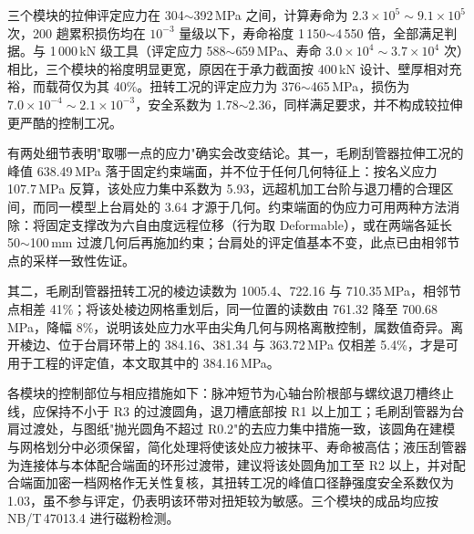 三个模块的拉伸评定应力在 304$\sim$392\,MPa 之间，计算寿命为 $2.3\times10^{5}\sim9.1\times10^{5}$ 次，200 趟累积损伤均在 $10^{-3}$ 量级以下，寿命裕度 1\,150$\sim$4\,550 倍，全部满足判据。与 1\,000\,kN 级工具（评定应力 588$\sim$659\,MPa、寿命 $3.0\times10^{4}\sim3.7\times10^{4}$ 次）相比，三个模块的裕度明显更宽，原因在于承力截面按 400\,kN 设计、壁厚相对充裕，而载荷仅为其 40\%。扭转工况的评定应力为 376$\sim$465\,MPa，损伤为 $7.0\times10^{-4}\sim2.1\times10^{-3}$，安全系数为 1.78$\sim$2.36，同样满足要求，并不构成较拉伸更严酷的控制工况。

有两处细节表明"取哪一点的应力"确实会改变结论。其一，毛刷刮管器拉伸工况的峰值 638.49\,MPa 落于固定约束端面，并不位于任何几何特征上：按名义应力 107.7\,MPa 反算，该处应力集中系数为 5.93，远超机加工台阶与退刀槽的合理区间，而同一模型上台肩处的 3.64 才源于几何。约束端面的伪应力可用两种方法消除：将固定支撑改为六自由度远程位移（行为取 Deformable），或在两端各延长 50$\sim$100\,mm 过渡几何后再施加约束；台肩处的评定值基本不变，此点已由相邻节点的采样一致性佐证。

其二，毛刷刮管器扭转工况的棱边读数为 1005.4、722.16 与 710.35\,MPa，相邻节点相差 41\%；将该处棱边网格重划后，同一位置的读数由 761.32 降至 700.68\,MPa，降幅 8\%，说明该处应力水平由尖角几何与网格离散控制，属数值奇异。离开棱边、位于台肩环带上的 384.16、381.34 与 363.72\,MPa 仅相差 5.4\%，才是可用于工程的评定值，本文取其中的 384.16\,MPa。

各模块的控制部位与相应措施如下：脉冲短节为心轴台阶根部与螺纹退刀槽终止线，应保持不小于 R3 的过渡圆角，退刀槽底部按 R1 以上加工；毛刷刮管器为台肩过渡处，与图纸"抛光圆角不超过 R0.2"的去应力集中措施一致，该圆角在建模与网格划分中必须保留，简化处理将使该处应力被抹平、寿命被高估；液压刮管器为连接体与本体配合端面的环形过渡带，建议将该处圆角加工至 R2 以上，并对配合端面加密一档网格作无关性复核，其扭转工况的峰值口径静强度安全系数仅为 1.03，虽不参与评定，仍表明该环带对扭矩较为敏感。三个模块的成品均应按 NB/T\,47013.4 进行磁粉检测。
